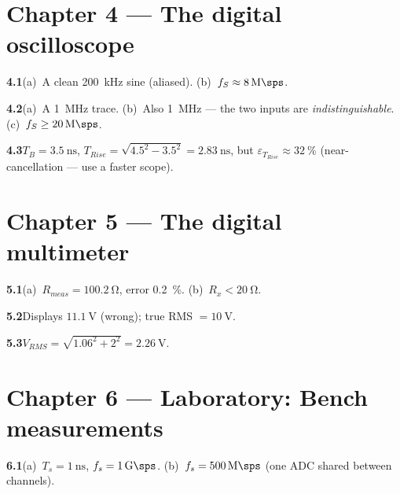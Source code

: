 \documentclass[11pt,a4paper,oneside]{book}
\newcommand{\ans}[1]{\par\smallskip\noindent\textbf{#1}\quad\ignorespaces}
\begin{document}
\section*{Chapter 4 --- The digital oscilloscope}
\ans{4.1}(a)~A clean \qty{200}{\kilo\hertz} sine (aliased).
(b)~$f_S\approx\qty{8}{\mega\sps}$.
\ans{4.2}(a)~A \qty{1}{\mega\hertz} trace.
(b)~Also \qty{1}{\mega\hertz} --- the two inputs are \emph{indistinguishable}.
(c)~$f_S\ge\qty{20}{\mega\sps}$.
\ans{4.3}$T_B=\qty{3.5}{\nano\second}$,
$T_{Rise}=\sqrt{4.5^2-3.5^2}=\qty{2.83}{\nano\second}$, but
$\varepsilon_{T_{Rise}}\approx\qty{32}{\percent}$ (near-cancellation --- use a
faster scope).

\section*{Chapter 5 --- The digital multimeter}
\ans{5.1}(a)~$R_{meas}=\qty{100.2}{\ohm}$, error \qty{0.2}{\percent}.
(b)~$R_x<\qty{20}{\ohm}$.
\ans{5.2}Displays $\qty{11.1}{\volt}$ (wrong); true RMS $=\qty{10}{\volt}$.
\ans{5.3}$V_{RMS}=\sqrt{1.06^2+2^2}=\qty{2.26}{\volt}$.

\section*{Chapter 6 --- Laboratory: Bench measurements}
\ans{6.1}(a)~$T_s=\qty{1}{\nano\second}$, $f_s=\qty{1}{\giga\sps}$.
(b)~$f_s=\qty{500}{\mega\sps}$ (one ADC shared between channels).
\end{document}
